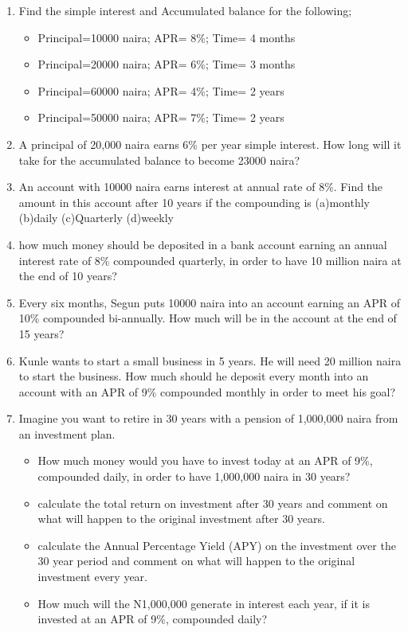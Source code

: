 \documentclass{article}
\begin{document}
	\begin{enumerate}
	\item Find the simple interest and Accumulated balance for the following;
	\begin{itemize}
		\item Principal=10000 naira; APR= 8\%; Time= 4 months
		\item Principal=20000 naira; APR= 6\%; Time= 3 months
		\item Principal=60000 naira; APR= 4\%; Time= 2 years
		\item Principal=50000 naira; APR= 7\%; Time= 2 years
	\end{itemize}
    \item A principal of 20,000 naira earns 6\% per year simple interest. How long will it take for the accumulated balance to become 23000 naira?
    \item An account with 10000 naira earns interest at annual rate of 8\%. Find the amount in this account after 10 years if the compounding is (a)monthly (b)daily (c)Quarterly (d)weekly
    \item how much money should be deposited in a bank account earning an annual interest rate of 8\% compounded quarterly, in order to have 10 million naira at the end of 10 years?
    \item Every six months, Segun puts 10000 naira into an account earning an APR of 10\% compounded bi-annually. How much will be in the account at the end of 15 years?
    \item Kunle wants to start a small business in 5 years. He will need 20 million naira to start the business. How much should he deposit every month into an account with an APR of 9\% compounded monthly in order to meet his goal?
    \item Imagine you want to retire in 30 years with a pension of 1,000,000 naira from an investment plan.
    \begin{itemize}
    	\item How much money would you have to invest today at an APR of 9\%, compounded daily, in order to have 1,000,000 naira in 30 years?
    	\item calculate the total return on investment after 30 years and comment on what will happen to the original investment after 30 years.
    	\item calculate the Annual Percentage Yield (APY) on the investment over the 30 year period and comment on what will happen to the original investment every year.
    	\item How much will the N1,000,000 generate in interest each year, if it is invested at an APR of 9\%, compounded daily?

\end{itemize}
\end{enumerate}
\end{document}
